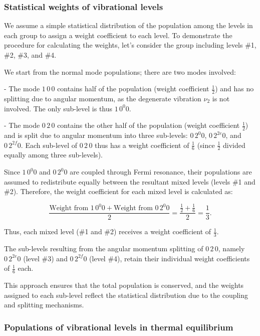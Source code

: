 \subsubsection{Statistical weights of vibrational levels}

We assume a simple statistical distribution of the population among the levels in each group to assign a weight coefficient to each level. To demonstrate the procedure for calculating the weights, let's consider the group including levels \#1, \#2, \#3, and \#4.

We start from the normal mode populations; there are two modes involved:

- The mode $1\,0\,0$ contains half of the population (weight coefficient $\frac{1}{2}$) and has no splitting due to angular momentum, as the degenerate vibration $\nu_2$ is not involved. The only sub-level is thus $1\,0^{0}0$.

- The mode $0\,2\,0$ contains the other half of the population (weight coefficient $\frac{1}{2}$) and is split due to angular momentum into three sub-levels: $0\,2^{0}0$, $0\,2^{2e}0$, and $0\,2^{2f}0$. Each sub-level of $0\,2\,0$ thus has a weight coefficient of $\frac{1}{6}$ (since $\frac{1}{2}$ divided equally among three sub-levels).

Since $1\,0^{0}0$ and $0\,2^{0}0$ are coupled through Fermi resonance, their populations are assumed to redistribute equally between the resultant mixed levels (levels \#1 and \#2). Therefore, the weight coefficient for each mixed level is calculated as:

\[
\frac{ \text{Weight from } 1\,0^{0}0 + \text{Weight from } 0\,2^{0}0 }{2} = \frac{ \frac{1}{2} + \frac{1}{6} }{2} = \frac{1}{3}.
\]

Thus, each mixed level (\#1 and \#2) receives a weight coefficient of $\frac{1}{3}$.

The sub-levels resulting from the angular momentum splitting of $0\,2\,0$, namely $0\,2^{2e}0$ (level \#3) and $0\,2^{2f}0$ (level \#4), retain their individual weight coefficients of $\frac{1}{6}$ each.

This approach ensures that the total population is conserved, and the weights assigned to each sub-level reflect the statistical distribution due to the coupling and splitting mechanisms.



\subsubsection{Populations of vibrational levels in thermal equilibrium}

